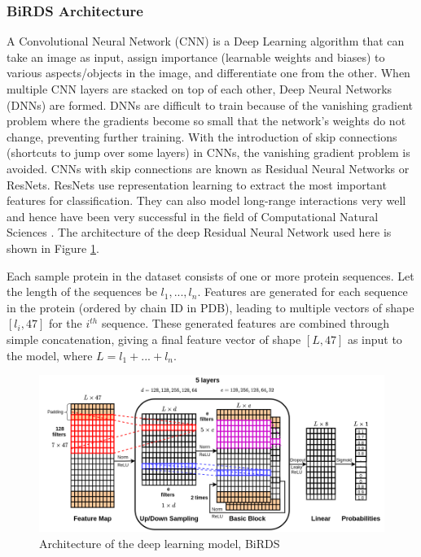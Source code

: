 \documentclass[journal=jcisd8,manuscript=article]{achemso}
\begin{document}
\subsubsection{BiRDS Architecture}
\quad A Convolutional Neural Network (CNN) is a Deep Learning algorithm that can take an image as input, assign importance (learnable weights and biases) to various aspects/objects in the image, and differentiate one from the other. When multiple CNN layers are stacked on top of each other, Deep Neural Networks (DNNs) are formed. DNNs are difficult to train because of the vanishing gradient problem where the gradients become so small that the network's weights do not change, preventing further training. With the introduction of skip connections (shortcuts to jump over some layers) in CNNs, the vanishing gradient problem is avoided. CNNs with skip connections are known as Residual Neural Networks or ResNets\cite{he2016deep}. ResNets use representation learning to extract the most important features for classification. They can also model long-range interactions very well and hence have been very successful in the field of Computational Natural Sciences \cite{senior2020improved}.  The architecture of the deep Residual Neural Network used here is shown in Figure \ref{fig:architecture}.

Each sample protein in the dataset consists of one or more protein sequences. Let the length of the sequences be $l_1, ..., l_n$. Features are generated for each sequence in the protein (ordered by chain ID in PDB), leading to multiple vectors of shape $[l_i, 47]$ for the $i^{th}$ sequence. These generated features are combined through simple concatenation, giving a final feature vector of shape $[L, 47]$ as input to the model, where $L = l_1 + ... + l_n$.

\begin{figure}
    \centering
    \noindent\includegraphics[scale=0.5]{architecture}
    \caption{\centering Architecture of the deep learning model, BiRDS}
    \label{fig:architecture}
\end{figure}
\end{document}
